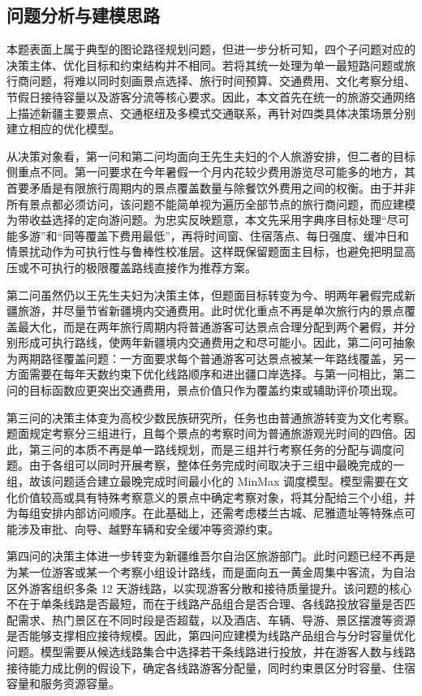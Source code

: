 \documentclass[UTF8,zihao=-4,a4paper]{ctexart}
\begin{document}
\subsection{问题分析与建模思路}
\label{subsec:problem_analysis}

本题表面上属于典型的图论路径规划问题，但进一步分析可知，四个子问题对应的决策主体、优化目标和约束结构并不相同。若将其统一处理为单一最短路问题或旅行商问题，将难以同时刻画景点选择、旅行时间预算、交通费用、文化考察分组、节假日接待容量以及游客分流等核心要求。因此，本文首先在统一的旅游交通网络上描述新疆主要景点、交通枢纽及多模式交通联系，再针对四类具体决策场景分别建立相应的优化模型。

从决策对象看，第一问和第二问均面向王先生夫妇的个人旅游安排，但二者的目标侧重点不同。第一问要求在今年暑假一个月内花较少费用游览尽可能多的地方，其首要矛盾是有限旅行周期内的景点覆盖数量与除餐饮外费用之间的权衡。由于并非所有景点都必须访问，该问题不能简单视为遍历全部节点的旅行商问题，而应建模为带收益选择的定向游问题。为忠实反映题意，本文先采用字典序目标处理“尽可能多游”和“同等覆盖下费用最低”，再将时间窗、住宿落点、每日强度、缓冲日和情景扰动作为可执行性与鲁棒性校准层。这样既保留题面主目标，也避免把明显高压或不可执行的极限覆盖路线直接作为推荐方案。

第二问虽然仍以王先生夫妇为决策主体，但题面目标转变为今、明两年暑假完成新疆旅游，并尽量节省新疆境内交通费用。此时优化重点不再是单次旅行内的景点覆盖最大化，而是在两年旅行周期内将普通游客可达景点合理分配到两个暑假，并分别形成可执行路线，使两年新疆境内交通费用之和尽可能小。因此，第二问可抽象为两期路径覆盖问题：一方面要求每个普通游客可达景点被某一年路线覆盖，另一方面需要在每年天数约束下优化线路顺序和进出疆口岸选择。与第一问相比，第二问的目标函数应更突出交通费用，景点价值只作为覆盖约束或辅助评价项出现。

第三问的决策主体变为高校少数民族研究所，任务也由普通旅游转变为文化考察。题面规定考察分三组进行，且每个景点的考察时间为普通旅游观光时间的四倍。因此，第三问的本质不再是单一路线规划，而是三组并行考察任务的分配与调度问题。由于各组可以同时开展考察，整体任务完成时间取决于三组中最晚完成的一组，故该问题适合建立最晚完成时间最小化的 MinMax 调度模型。模型需要在文化价值较高或具有特殊考察意义的景点中确定考察对象，将其分配给三个小组，并为每组安排内部访问顺序。在此基础上，还需考虑楼兰古城、尼雅遗址等特殊点可能涉及审批、向导、越野车辆和安全缓冲等资源约束。

第四问的决策主体进一步转变为新疆维吾尔自治区旅游部门。此时问题已经不再是为某一位游客或某一个考察小组设计路线，而是面向五一黄金周集中客流，为自治区外游客组织多条 12 天游线路，以实现游客分散和接待质量提升。该问题的核心不在于单条线路是否最短，而在于线路产品组合是否合理、各线路投放容量是否匹配需求、热门景区在不同时段是否超载，以及酒店、车辆、导游、景区摆渡等资源是否能够支撑相应接待规模。因此，第四问应建模为线路产品组合与分时容量优化问题。模型需要从候选线路集合中选择若干条线路进行投放，并在游客人数与线路接待能力成比例的假设下，确定各线路游客分配量，同时约束景区分时容量、住宿容量和服务资源容量。
\end{document}
